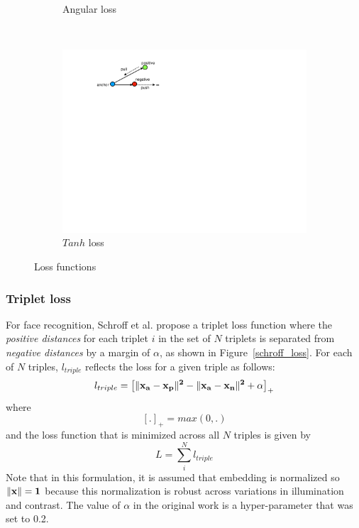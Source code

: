 \begin{figure}[htb]
\begin{subfigure}[t]{0.23\textwidth}
        \caption{Angular loss}
        \label{angular_loss}
    \end{subfigure}
    ~ 
    \begin{subfigure}[t]{0.23\textwidth}
        \centering 
        \includegraphics[width=.9\linewidth]{tanh_triplet}
        \caption{$Tanh$ loss}
        \label{tanh_loss}
    \end{subfigure}
    \caption{Loss functions}
\end{figure}

\subsubsection{Triplet loss}

For face recognition, Schroff et al. \cite{DBLP:conf/cvpr/SchroffKP15} propose a triplet loss function where the \textit{positive distances} for each triplet $i$ in the set of $N$ triplets is separated from \textit{negative distances} by a margin of $\alpha$, as shown in Figure~\ref{schroff_loss}.  For each of $N$ triples, $l_{triple}$ reflects the loss for a given triple as follows:
\begin{equation}
  l_{triple} =  \left[\|\bf{x_a} - \bf{x_p}\|^2 - \|\bf{x_a} -\bf{x_n}\|^2 + \alpha \right]_+
\label{schroff}
\end{equation}
where
\begin{equation}
 \left[.\right]_{+} = max(0, .)
\end{equation}
and the loss function that is minimized across all $N$ triples is given by
\begin{equation}
 L = \sum_{i}^{N} l_{triple}
\end{equation}
Note that in this formulation, it is assumed that embedding is normalized so $\|\bf{x} \| = 1$ because this normalization is robust across variations in illumination and contrast.  The value of $\alpha$ in the original work is a hyper-parameter that \cite{DBLP:conf/cvpr/SchroffKP15} was set to 0.2.

